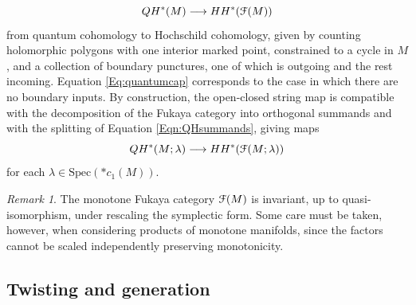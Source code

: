 \documentclass[reqno,10pt]{amsart}
\numberwithin{equation}{section}
\newcommand{\scrF}{\EuScript{F}}
\theoremstyle{remark}
\newtheorem{Remark}[thm]{Remark}
\begin{document}
\[
QH^*(M) \longrightarrow HH^*(\scrF(M))
\]
from quantum cohomology to Hochschild cohomology, given by counting holomorphic polygons with one interior marked point,  constrained to a cycle in $M$, and a collection of boundary punctures, one of which is outgoing and the rest incoming. Equation \ref{Eq:quantumcap} corresponds to the case in which there are no boundary inputs.  By construction, the open-closed string map is compatible with the decomposition of the Fukaya category into orthogonal summands and with the splitting of Equation \ref{Eqn:QHsummands}, giving maps
\[
QH^*(M;\lambda) \longrightarrow HH^*(\scrF(M; \lambda))
\]
for each $\lambda \in \textrm{Spec}(\ast c_1(M))$.

\begin{Remark} \label{Rem:ScaleSymplecticForm}
The monotone Fukaya category $\scrF(M)$ is invariant, up to quasi-isomorphism, under rescaling the symplectic form. Some care must be taken, however, when considering products of monotone manifolds, since the factors cannot be scaled independently preserving monotonicity. 
\end{Remark}

\subsection{Twisting and generation}
\end{document}
